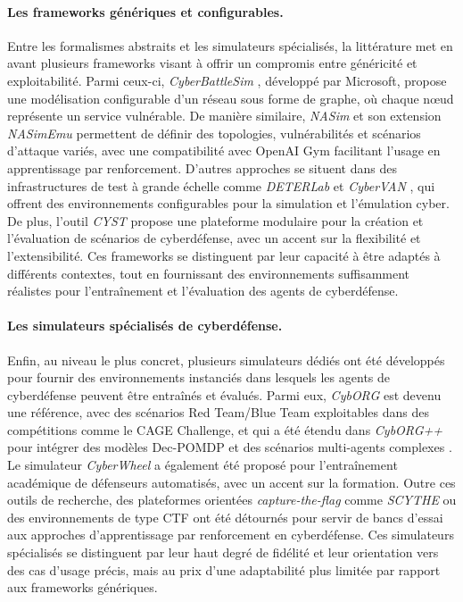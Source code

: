 \paragraph{Les frameworks génériques et configurables.}
Entre les formalismes abstraits et les simulateurs spécialisés, la littérature met en avant plusieurs frameworks visant à offrir un compromis entre généricité et exploitabilité. Parmi ceux-ci, \textit{CyberBattleSim} \cite{cyberbattlesim}, développé par Microsoft, propose une modélisation configurable d’un réseau sous forme de graphe, où chaque nœud représente un service vulnérable. De manière similaire, \textit{NASim} \cite{nasim2023} et son extension \textit{NASimEmu} \cite{fernandes2024nasimemu} permettent de définir des topologies, vulnérabilités et scénarios d’attaque variés, avec une compatibilité avec OpenAI Gym facilitant l’usage en apprentissage par renforcement. D’autres approches se situent dans des infrastructures de test à grande échelle comme \textit{DETERLab} et \textit{CyberVAN} \cite{Mirkovic2010}, qui offrent des environnements configurables pour la simulation et l’émulation cyber. De plus, l'outil \textit{CYST} \cite{Drasar2020} propose une plateforme modulaire pour la création et l’évaluation de scénarios de cyberdéfense, avec un accent sur la flexibilité et l’extensibilité. Ces frameworks se distinguent par leur capacité à être adaptés à différents contextes, tout en fournissant des environnements suffisamment réalistes pour l’entraînement et l’évaluation des agents de cyberdéfense.

\paragraph{Les simulateurs spécialisés de cyberdéfense.}
Enfin, au niveau le plus concret, plusieurs simulateurs dédiés ont été développés pour fournir des environnements instanciés dans lesquels les agents de cyberdéfense peuvent être entraînés et évalués. Parmi eux, \textit{CybORG} \cite{Standen2021} est devenu une référence, avec des scénarios Red Team/Blue Team exploitables dans des compétitions comme le CAGE Challenge, et qui a été étendu dans \textit{CybORG++} pour intégrer des modèles Dec-POMDP et des scénarios multi-agents complexes \cite{landolt2025cyborgpp}. Le simulateur \textit{CyberWheel} \cite{vyas2025cyberwheel} a également été proposé pour l’entraînement académique de défenseurs automatisés, avec un accent sur la formation. Outre ces outils de recherche, des plateformes orientées \textit{capture-the-flag} comme \textit{SCYTHE} ou des environnements de type CTF \cite{palmer2023ctf} ont été détournés pour servir de bancs d’essai aux approches d’apprentissage par renforcement en cyberdéfense. Ces simulateurs spécialisés se distinguent par leur haut degré de fidélité et leur orientation vers des cas d’usage précis, mais au prix d’une adaptabilité plus limitée par rapport aux frameworks génériques.

